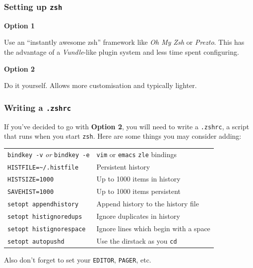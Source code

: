 \documentclass{beamer}
\begin{document}
\begin{frame}
    \frametitle{Setting up \texttt{zsh}}
    \textbf{Option 1}

    Use an ``instantly awesome zsh'' framework like \emph{Oh My Zsh} or
    \emph{Prezto}. This has the advantage of a \emph{Vundle}-like plugin system
    and less time spent configuring.

    \medskip

    \textbf{Option 2}

    Do it yourself. Allows more customisation and typically lighter.
\end{frame}

\begin{frame}[fragile]
    \frametitle{Writing a \texttt{.zshrc}}

    If you've decided to go with \textbf{Option 2}, you will need to write a
    \texttt{.zshrc}, a script that runs when you start \texttt{zsh}. Here are
    some things you may consider adding:
    \medskip

    \begin{tabular}{l l}
        \texttt{bindkey -v} \emph{or} \texttt{bindkey -e} & \texttt{vim} or
        \texttt{emacs} \texttt{zle} bindings \\
        \texttt{HISTFILE=\textasciitilde/.histfile} & Persistent history \\
        \texttt{HISTSIZE=1000} & Up to 1000 items in history \\
        \texttt{SAVEHIST=1000} & Up to 1000 items persistent \\
        \texttt{setopt appendhistory} & Append history to the history file \\
        \texttt{setopt histignoredups} & Ignore duplicates in history \\
        \texttt{setopt histignorespace} & Ignore lines which begin with a space \\
        \texttt{setopt autopushd} & Use the dirstack as you \texttt{cd}
    \end{tabular}

    \medskip

    Also don't forget to set your \texttt{EDITOR}, \texttt{PAGER}, etc.

\end{frame}
\end{document}
